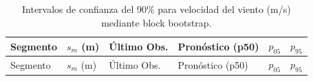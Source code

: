 \documentclass[
  spanish,
  us-letterpaper,
]{scrreprt}
\numberwithin{equation}{section}
\begin{document}
\begin{longtable}[]{@{}
  >{\raggedright\arraybackslash}p{}
  >{\raggedright\arraybackslash}p{}
  >{\raggedright\arraybackslash}p{}
  >{\raggedright\arraybackslash}p{}
  >{\raggedright\arraybackslash}p{}
  >{\raggedright\arraybackslash}p{}@{}}
\caption{Intervalos de confianza del 90\% para velocidad del viento
(m/s) mediante block
bootstrap.}\label{tbl-incertidumbre-viento}\tabularnewline
\toprule\noalign{}
\begin{minipage}[b]{\linewidth}\raggedright
Segmento
\end{minipage} & \begin{minipage}[b]{\linewidth}\raggedright
\(s_m\) (m)
\end{minipage} & \begin{minipage}[b]{\linewidth}\raggedright
Último Obs.
\end{minipage} & \begin{minipage}[b]{\linewidth}\raggedright
Pronóstico (p50)
\end{minipage} & \begin{minipage}[b]{\linewidth}\raggedright
\(p_{05}\)
\end{minipage} & \begin{minipage}[b]{\linewidth}\raggedright
\(p_{95}\)
\end{minipage} \\
\midrule\noalign{}
\endfirsthead
\toprule\noalign{}
\begin{minipage}[b]{\linewidth}\raggedright
Segmento
\end{minipage} & \begin{minipage}[b]{\linewidth}\raggedright
\(s_m\) (m)
\end{minipage} & \begin{minipage}[b]{\linewidth}\raggedright
Último Obs.
\end{minipage} & \begin{minipage}[b]{\linewidth}\raggedright
Pronóstico (p50)
\end{minipage} & \begin{minipage}[b]{\linewidth}\raggedright
\(p_{05}\)
\end{minipage} & \begin{minipage}[b]{\linewidth}\raggedright
\(p_{95}\)
\end{minipage} \\

\end{longtable}
\end{document}
